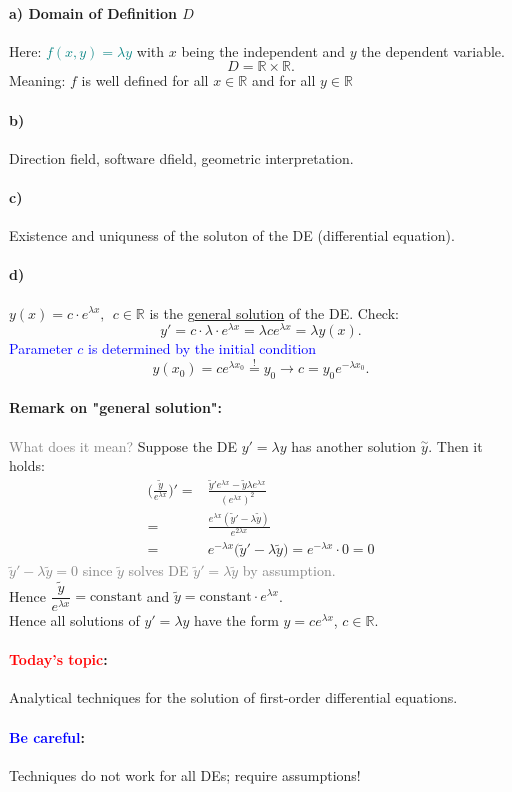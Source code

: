 \documentclass[]{article}
\begin{document}
	\paragraph{a) Domain of Definition $D$}
	Here: \textcolor{teal}{$f(x,y)=\lambda y$} with $x$ being the independent and $y$ the dependent variable.
	\[
	D= \mathbb R\times \mathbb R
	.\]
	Meaning: $f$ is well defined for all $x\in \mathbb R$ and for all $y\in \mathbb R$
	\paragraph{b)} Direction field, software dfield, geometric interpretation.
	\paragraph{c)} Existence and uniquness of the soluton of the DE (differential equation).
	\paragraph{d)} $y(x)=c \cdot e ^{\lambda x},~~c\in \mathbb R$ is the g\underline{eneral solution} of the DE. Check:
	\[
	y'=c \cdot \lambda \cdot e ^{\lambda x}= \lambda c e ^{\lambda x}=\lambda y(x)
	.\]
	\textcolor{blue}{Parameter $c$ is determined by the initial condition}
	\[
	y(x_0)=ce ^{\lambda x_0 }\overset ! = y_0 \rightarrow c= y_0e ^{-\lambda x_0}
	.\]
	\paragraph{Remark on "general solution":} \textcolor{gray}{What does it mean?} Suppose the DE $y'=\lambda y $ has another solution $\overset \sim y$. Then it holds:
	\[
	\begin{split}
		\Bigg( \frac{\tilde y}{e ^{\lambda x}}\Bigg)'= & \frac{\tilde y' e ^{\lambda x}-\tilde y \lambda e ^{\lambda  x}}{(e ^{\lambda x}) ^{2}} \\
		= & \frac{e ^{\lambda x}(\tilde y'-\lambda \tilde y)}{e ^{2 \lambda x}}\\
		= & e ^{-\lambda x}\big(\tilde y'-\lambda \tilde y)=e ^{-\lambda x} \cdot 0 = 0 
	\end{split}
	\]
	\textcolor{gray}{$\tilde y'-\lambda \tilde y = 0$ since $\tilde y$ solves DE $\tilde y' = \lambda \tilde y$ by assumption.}\\
	Hence $ \dfrac{\tilde y}{e ^{\lambda x}}= \text{constant}$ and $\tilde y = \text{constant} \cdot e ^{\lambda x}$.\\
	Hence all solutions of $y'=\lambda y$ have the form $y=ce ^{\lambda x}$, $c\in \mathbb R$.
	\begin{multicols}{2}
	\paragraph{ \textcolor{red}{Today's topic}:} Analytical techniques for the solution of first-order differential equations.
	\paragraph{ \textcolor{blue}{Be careful}:} Techniques do not work for all DEs; require assumptions!
	\end{multicols}
\end{document}
